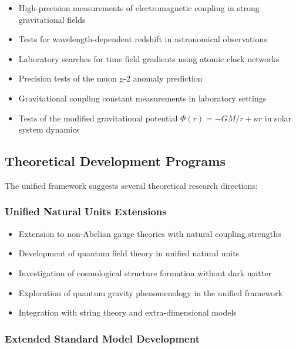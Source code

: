 \documentclass[12pt,a4paper]{article}
\begin{document}
	\begin{itemize}
		\item High-precision measurements of electromagnetic coupling in strong gravitational fields
		\item Tests for wavelength-dependent redshift in astronomical observations
		\item Laboratory searches for time field gradients using atomic clock networks \cite{Ludlow2015}
		\item Precision tests of the muon g-2 anomaly prediction \cite{pascher_muon_g2_2025}
		\item Gravitational coupling constant measurements in laboratory settings \cite{Quinn2013}
		\item Tests of the modified gravitational potential $\Phi(r) = -GM/r + \kappa r$ in solar system dynamics
	\end{itemize}
	
	\subsection{Theoretical Development Programs}
	\label{subsec:theoretical_development}
	
	The unified framework suggests several theoretical research directions:
	
	\subsubsection{Unified Natural Units Extensions}
	\label{subsubsec:unified_extensions}
	
	\begin{itemize}
		\item Extension to non-Abelian gauge theories with natural coupling strengths
		\item Development of quantum field theory in unified natural units \cite{pascher_lagrangian_2025}
		\item Investigation of cosmological structure formation without dark matter
		\item Exploration of quantum gravity phenomenology in the unified framework
		\item Integration with string theory and extra-dimensional models
	\end{itemize}
	
	\subsubsection{Extended Standard Model Development}
	\label{subsubsec:esm_development}
	
\end{document}

